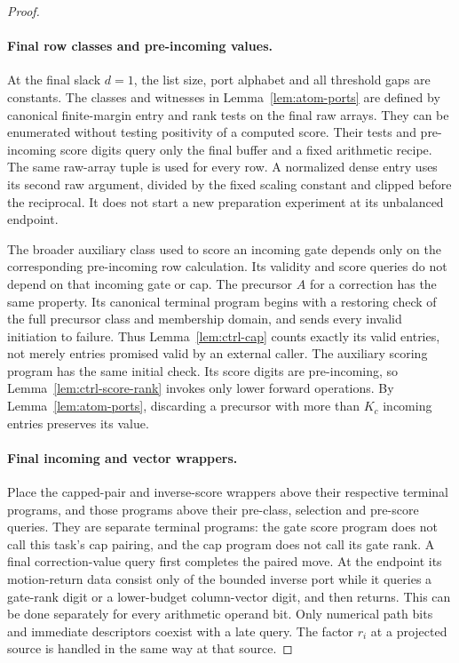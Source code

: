\begin{proof}
\paragraph{Final row classes and pre-incoming values.}
At the final slack $d=1$, the list size, port alphabet and all threshold
gaps are constants.  The classes and witnesses in
Lemma~\ref{lem:atom-ports} are defined by canonical finite-margin entry
and rank tests on the final raw arrays.  They can be enumerated without
testing positivity of a computed score.  Their tests and pre-incoming
score digits query only the final buffer and a fixed arithmetic recipe.
The same raw-array tuple is used for every row.  A normalized dense
entry uses its second raw argument, divided by the fixed scaling
constant and clipped before the reciprocal.  It does not start a new
preparation experiment at its unbalanced endpoint.

The broader auxiliary class used to score an incoming gate depends
only on the corresponding pre-incoming row calculation.  Its validity
and score queries do not depend on that incoming gate or cap.  The
precursor $A$ for a correction has the same property.  Its canonical
terminal program begins with a restoring check of the full precursor
class and membership domain, and sends every invalid initiation to
failure.  Thus Lemma~\ref{lem:ctrl-cap} counts exactly its valid entries,
not merely entries promised valid by an external caller.  The auxiliary
scoring program has the same initial check.  Its score digits are
pre-incoming, so Lemma~\ref{lem:ctrl-score-rank} invokes only lower
forward operations.  By Lemma~\ref{lem:atom-ports}, discarding a
precursor with more than $K_c$ incoming entries preserves its value.

\paragraph{Final incoming and vector wrappers.}
Place the capped-pair and inverse-score wrappers above their respective
terminal programs, and those programs above their pre-class, selection
and pre-score queries.  They are separate terminal programs: the gate
score program does not call this task's cap pairing, and the cap
program does not call its gate rank.  A final correction-value query
first completes the paired move.  At the endpoint its motion-return data consist only of the
bounded inverse port while it queries a gate-rank digit or a lower-budget
column-vector digit, and then returns.  This can be done separately for
every arithmetic operand bit.  Only numerical path bits and immediate
descriptors coexist with a late query.  The factor $r_i$ at a projected
source is handled in the same way at that source.


\end{proof}

